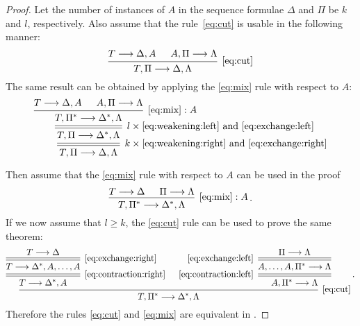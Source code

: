 \documentclass[11pt,a4paper]{article}
\begin{document}
\begin{proof}
    Let the number of instances of \(A\) in the sequence
    formulae \(\Delta\) and \(\Pi\) be \(k\) and \(l\),
    respectively. Also assume that the rule~\eqref{eq:cut}
    is usable in the following manner:
    \begin{equation*}
        \begin{prooftree}
            \hypo{T\seq\Delta, A}
            \hypo{A, \Pi\seq\Lambda}
            \infer2[\eqref{eq:cut}]{T,\Pi\seq\Delta,\Lambda}
        \end{prooftree}
    \end{equation*}
    The same result can be obtained by applying the \eqref{eq:mix} rule with respect to \(A\):
    \begin{equation*}
        \begin{prooftree}
            \hypo{T\seq\Delta, A}
            \hypo{A, \Pi\seq\Lambda}
            \infer2[\(\eqref{eq:mix}:A\)]{T,\Pi^\ast\seq\Delta^\ast,\Lambda}
            \infer[rule style=double]1[\(l\times\eqref{eq:weakening:left}\) and \eqref{eq:exchange:left}]{
                T,\Pi\seq\Delta^\ast,\Lambda
            }
            \infer[rule style=double]1[\(k\times\eqref{eq:weakening:right}\) and \eqref{eq:exchange:right}]{
                T,\Pi\seq\Delta,\Lambda
            }
        \end{prooftree}
    \end{equation*}

    Then assume that the \eqref{eq:mix} rule with respect to \(A\) can be used in the proof
    \begin{equation*}
        \begin{prooftree}
            \hypo{T\seq\Delta}
            \hypo{\Pi\seq\Lambda}
            \infer2[\(\eqref{eq:mix}:A\)]{T,\Pi^\ast\seq\Delta^\ast,\Lambda}
        \end{prooftree} \,.
    \end{equation*}
    If we now assume that \(l\geq k\), the \eqref{eq:cut} rule can be used to prove the same theorem:
    \begin{equation*}
        \begin{prooftree}
            \hypo{T\seq\Delta}
            \infer[rule style=double]1[\eqref{eq:exchange:right}]{T\seq\Delta^\ast, A,\ldots, A}
            \infer[rule style=double]1[\eqref{eq:contraction:right}]{T\seq\Delta^\ast, A}
            \hypo{\Pi\seq\Lambda}
            \infer[rule style=double,left label=\eqref{eq:exchange:left}]1{A,\ldots,A,\Pi^\ast\seq\Lambda}
            \infer[rule style=double,left label=\eqref{eq:contraction:left}]1{A,\Pi^\ast\seq\Lambda}
            \infer2[\eqref{eq:cut}]{T,\Pi^\ast\seq\Delta^\ast,\Lambda}
        \end{prooftree}\,.
    \end{equation*}
    Therefore the rules \eqref{eq:cut} and \eqref{eq:mix} are equivalent in \LK.
\end{proof}
\end{document}
